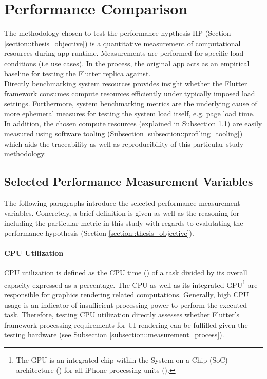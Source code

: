 \section{Performance Comparison} \label{section::performance_comparison_design}
The methodology chosen to test the performance hypthesis HP (Section \ref{section::thesis_objective}) is a quantitative
measurement of computational resources during app runtime. Measurements are performed for
specific load conditions (i.e use cases). In the process, the original app acts as an empirical
baseline for testing the Flutter replica against.\\
Directly benchmarking system resources provides insight whether the Flutter framework consumes
compute resources efficiently under typically imposed load settings. Furthermore, system
benchmarking metrics are the underlying cause of more ephemeral measures for testing the
system load itself, e.g. page load time. In addition, the chosen compute resources (explained
in Subsection \ref{subsection::selected_measurement_variables}) are easily measured using software tooling (Subsection \ref{subsection::profiling_tooling}) which aids the
traceability as well as reproducibility of this particular study methodology.

\subsection{Selected Performance Measurement Variables} \label{subsection::selected_measurement_variables}
The following paragraphs introduce the selected performance measurement variables. Concretely,
a brief definition is given as well as the reasoning for including the particular metric in
this study with regards to evalutating the performance hypothesis (Section \ref{section::thesis_objective}).

\paragraph*{CPU Utilization}\label{paragraph::cpu_utilization}\hfill \break
CPU utilization is defined as the CPU time (\cite{FSF1988}) of a task
divided by its overall capacity expressed as a percentage. The CPU as well as its integrated GPU\footnote{The GPU is an integrated chip within the System-on-a-Chip (SoC) architecture (\cite{Martin2001}) for all
iPhone processing units (\cite{WikiChip2020}).}
are responsible for graphics rendering related computations. Generally, high CPU usage is an
indicator of insufficient processing power to perform the executed task. Therefore, testing CPU utilization
directly assesses whether Flutter’s framework processing requirements for UI rendering can be
fulfilled given the testing hardware (see Subsection \ref{subsection::measurement_process}).

